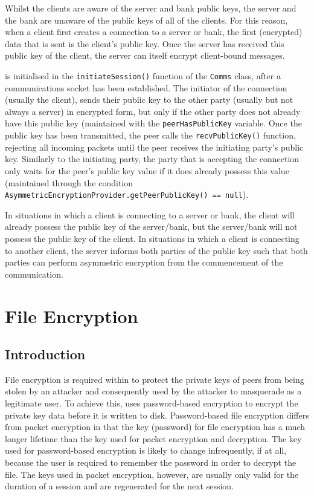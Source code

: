 \documentclass[a4paper,11pt]{article}
\begin{document}
Whilst the clients are aware of the server and bank public keys, the server and 
the bank are unaware of the public keys of all of the clients. For this reason, 
when a client first creates a connection to a \serviceName{} server or bank, the
first (encrypted) data that is sent is the client's public key. Once the server
has received this public key of the client, the server can itself encrypt 
client-bound messages.

 is initialised in the \verb+initiateSession()+ 
function of the \verb+Comms+ class, after a communications socket has been 
established. The initiator of the connection (usually the client), sends their
public key to the other party (usually but not always a server) in encrypted 
form, but only if the other party does not already have this public key 
(maintained with the \verb+peerHasPublicKey+ variable. Once the public key has 
been transmitted, the \serviceName{} peer calls the \verb+recvPublicKey()+ 
function, rejecting all incoming packets until the peer receives the initiating 
party's public key. Similarly to the initiating party, the party that is 
accepting the connection only waits for the peer's public key value if it does 
already possess this value (maintained through the condition \\
\verb+AsymmetricEncryptionProvider.getPeerPublicKey() == null+).

In situations in which a client is connecting to a \serviceName{} server or 
bank, the client will already possess the public key of the server/bank, but the
server/bank will not possess the public key of the client. In situations in 
which a client is connecting to another client, the server informs both parties 
of the public key such that both parties can perform asymmetric encryption from 
the commencement of the communication.
 
\section{File Encryption}

\subsection{Introduction}
File encryption is required within \packageName{} to protect the private keys of
\serviceName{} peers from being stolen by an attacker and consequently used by 
the attacker to masquerade as a legitimate user. To achieve this, \packageName{}
uses password-based encryption to encrypt the private key data before it is 
written to disk. Password-based file encryption differs from \packageName{} 
packet encryption in that the key (password) for file encryption has a much 
longer lifetime than the key used for packet encryption and decryption. The key 
used for password-based encryption is likely to change infrequently, if at all, 
because the user is required to remember the password in order to decrypt the 
file. The keys used in packet encryption, however, are usually only valid for 
the duration of a session and are regenerated for the next session.
\end{document}
